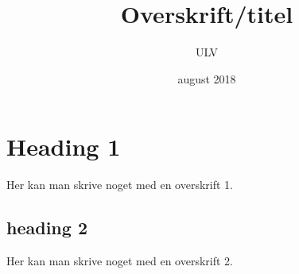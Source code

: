 \documentclass[danmark]{UNF}
\title{Overskrift/titel}
\author{ULV}
\date{august 2018}
\begin{document}
\maketitle

\section{Heading 1}
Her kan man skrive noget med en overskrift 1.

\subsection{heading 2}
Her kan man skrive noget med en overskrift 2.
\end{document}
